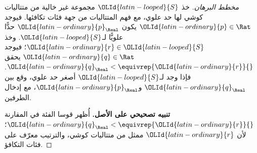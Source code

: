\documentclass[../../../include/open-logic-section]{subfiles}
\begin{document}
\begin{proof}[مخطط البرهان]
خذ ${\OLId{latin-looped}{S}}$ مجموعة غير خالية من متتاليات كوشي لها حد علوي، مع فهم المتتاليات من جهة فئات تكافئها. فيوجد ${\OLId{latin-ordinary}{p}} \in \Rat$ يكون ${\OLId{latin-ordinary}{p}}_{\Real}$ حدًّا علويًّا لـ${\OLId{latin-looped}{S}}$. وخذ ${\OLId{latin-ordinary}{r}} \in {\OLId{latin-looped}{S}}$؛ فيوجد ${\OLId{latin-ordinary}{q}} \in \Rat$ يحقق ${\OLId{latin-ordinary}{q}}_{\Real} < \equivrep{{\OLId{latin-ordinary}{r}}}{}$. فإذا وجد لـ${\OLId{latin-looped}{S}}$ أصغر حد علوي، وقع بين ${\OLId{latin-ordinary}{q}}_\Real$ و${\OLId{latin-ordinary}{p}}_\Real$، مع إدخال الطرفين.

\textbf{تنبيه تصحيحي على الأصل.} أُظهر قوسا الفئة في المقارنة
${\OLId{latin-ordinary}{q}}_\Real < \equivrep{{\OLId{latin-ordinary}{r}}}{}$؛ لأن ${\OLId{latin-ordinary}{r}}$ ممثل من متتاليات كوشي، والترتيب
معرّف على فئات التكافؤ.


\end{proof}
\end{document}
